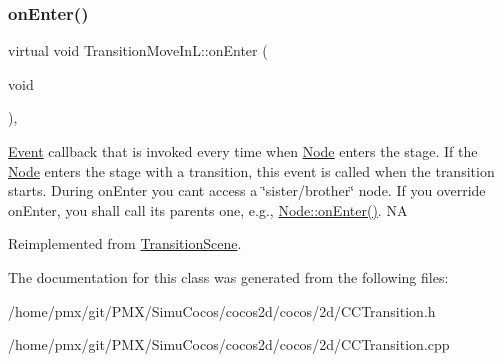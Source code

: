 \subsubsection{\texorpdfstring{on\+Enter()}{onEnter()}\hspace{0.1cm}{\footnotesize\ttfamily [2/2]}}
{\footnotesize\ttfamily virtual void Transition\+Move\+In\+L\+::on\+Enter (\begin{DoxyParamCaption}\item[{void}]{ }\end{DoxyParamCaption})\hspace{0.3cm}{\ttfamily [override]}, {\ttfamily [virtual]}}

\hyperlink{classEvent}{Event} callback that is invoked every time when \hyperlink{classNode}{Node} enters the \textquotesingle{}stage\textquotesingle{}. If the \hyperlink{classNode}{Node} enters the \textquotesingle{}stage\textquotesingle{} with a transition, this event is called when the transition starts. During on\+Enter you can\textquotesingle{}t access a \char`\"{}sister/brother\char`\"{} node. If you override on\+Enter, you shall call its parent\textquotesingle{}s one, e.\+g., \hyperlink{classNode_a7f51764c4afd5018a052b9ef71c03374}{Node\+::on\+Enter()}.  NA 

Reimplemented from \hyperlink{classTransitionScene_aace390a1bd8f3c73bb650a1e256a0f83}{Transition\+Scene}.



The documentation for this class was generated from the following files\+:\begin{DoxyCompactItemize}
\item 
/home/pmx/git/\+P\+M\+X/\+Simu\+Cocos/cocos2d/cocos/2d/C\+C\+Transition.\+h\item 
/home/pmx/git/\+P\+M\+X/\+Simu\+Cocos/cocos2d/cocos/2d/C\+C\+Transition.\+cpp\end{DoxyCompactItemize}
